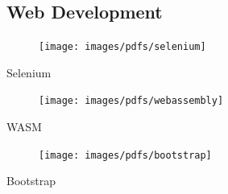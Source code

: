 \begin{aside}
    \subsection{Web Development}
      \begin{center}
        \vspace{2mm}%
        \begin{minipage}[t]{12mm}
          \begin{center}
            \begin{figure}
              \texttt{[image: images/pdfs/selenium]}
            \end{figure}
            \small{Selenium}
          \end{center}
        \end{minipage}\hspace{0.5mm}%
        \vspace{2mm}%
        \begin{minipage}[t]{12mm}
          \begin{center}
            \begin{figure}
              \texttt{[image: images/pdfs/webassembly]}
            \end{figure}
            \small{WASM}
          \end{center}
        \end{minipage}\hspace{0.5mm}%
        \begin{minipage}[t]{12mm}
          \begin{center}
            \begin{figure}
              \texttt{[image: images/pdfs/bootstrap]}
            \end{figure}
            \small{Bootstrap}
          \end{center}
        \end{minipage}\hspace{0.5mm}%
      \end{center}

\end{aside}
